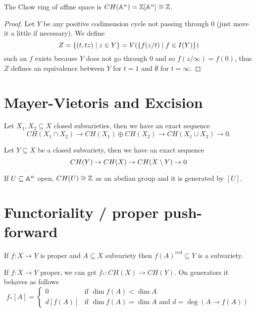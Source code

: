 \begin{proposition}
The Chow ring of affine space is $CH(\mathbb{A}^n)=\mathbb{Z}[\mathbb{A}^n]\cong \mathbb{Z}$.
\end{proposition}
\begin{proof}
Let $Y$ be any positive codimension cycle not passing through $0$ (just move it a little if necessary).
We define
\[Z=\left\{{(t,tz)\mid z\in Y}\right\}=V(\left\{{f(z/t)\mid f\in I(Y)}\right\})\]
such an $f$ exists because $Y$ does not go through $0$ and so $f(z/\infty)=f(0)$, thus $Z$ defines an equivalence between $Y$ for $t=1$ and $\emptyset$ for $t=\infty$.
\end{proof}

\section{Mayer-Vietoris and Excision}

\begin{theorem}
Let $X_1,X_2\subseteq X$ closed subvarieties, then we have an exact sequence
\[CH(X_1\cap X_2)\to CH(X_1)\oplus CH(X_2)\to CH(X_1\cup X_2)\to 0.\]
\end{theorem}


\begin{theorem}[Excision]
Let $Y\subseteq X$ be a closed subvariety, then we have an exact sequence
\[CH(Y)\to CH(X)\to CH(X\setminus Y)\to 0\]
\end{theorem}

\begin{corollary}
If $U\subseteq \mathbb{A}^n$ open, $CH(U)\cong \mathbb{Z}$ as an abelian group and it is generated by $[U]$.
\end{corollary}


\section{Functoriality / proper push-forward}

\begin{remark}
If $f:X\to Y$ is proper and $A\subseteq X$ subvariety then $f(A)^{red}\subseteq Y$ is a subvariety.
\end{remark}



\begin{theorem}
If $f:X\to Y$ proper, we can get $f_\ast:CH(X)\to CH(Y)$. On generators it behaves as follows
\[f_\ast[A]=\begin{cases}
0 &\text{if }\dim f(A)<\dim A\\
d[f(A)] &\text{if }\dim f(A)=\dim A\text{ and }d=\deg(A\to f(A))
\end{cases}\]
\end{theorem}


